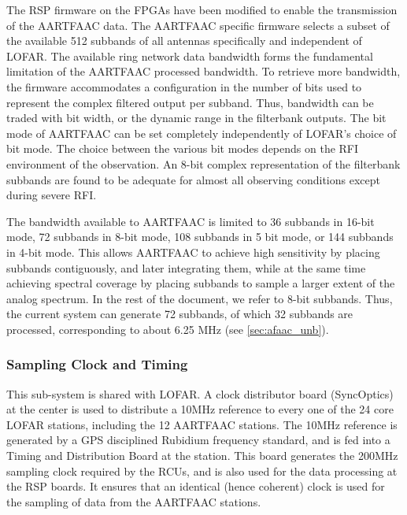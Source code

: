 \documentclass{ws-jai}
\begin{document}

The RSP firmware on  the FPGAs have been modified to  enable the transmission of
the  AARTFAAC data.   The AARTFAAC  specific firmware  selects a  subset of  the
available 512  subbands of all  antennas specifically and independent  of LOFAR.
The available  ring network data  bandwidth forms the fundamental  limitation of
the  AARTFAAC processed  bandwidth.  To  retrieve more  bandwidth, the  firmware
accommodates a configuration in the number of bits used to represent the complex
filtered output per  subband.  Thus, bandwidth can be traded  with bit width, or
the dynamic range  in the filterbank outputs.   The bit mode of  AARTFAAC can be
set completely independently  of LOFAR's choice of bit mode.  The choice between
the various  bit modes depends  on the RFI  environment of the  observation.  An
8-bit complex representation of the filterbank subbands are found to be adequate
for almost all observing conditions except during severe RFI.

The bandwidth available to AARTFAAC is limited to 36 subbands in 16-bit mode, 72
subbands in  8-bit mode, 108 subbands  in 5 bit  mode, or 144 subbands  in 4-bit
mode.   This allows  AARTFAAC to  achieve high  sensitivity by  placing subbands
contiguously,  and later  integrating them,  while  at the  same time  achieving
spectral coverage  by placing subbands to  sample a larger extent  of the analog
spectrum. In the  rest of the document,  we refer to 8-bit  subbands.  Thus, the
current system  can generate 72  subbands, of  which 32 subbands  are processed,
corresponding to about 6.25 MHz (see \ref{sec:afaac_unb}).\\

\subsubsection  {Sampling Clock and  Timing}
 This sub-system is  shared with
LOFAR.  A  clock  distributor  board  (SyncOptics) at  the  center  is  used  to
distribute  a 10MHz  reference  to every  one  of the  24  core LOFAR  stations,
including the 12  AARTFAAC stations.  The 10MHz reference is  generated by a GPS
disciplined  Rubidium  frequency  standard,  and   is  fed  into  a  Timing  and
Distribution Board  at the  station.  This board  generates the  200MHz sampling
clock required by the RCUs, and is also  used for the data processing at the RSP
boards. It  ensures that  an identical  (hence coherent) clock  is used  for the
sampling of data from the AARTFAAC stations.
\end{document}
